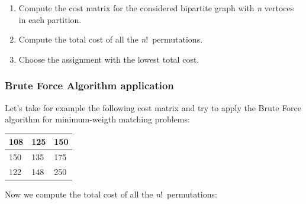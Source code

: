 \begin{enumerate}
    \item {Compute the cost matrix for the considered bipartite graph with \textit{n} vertoces in each partition.}
    \item {Compute the total cost of all the \textit{n}!\ permutations.}
    \item {Choose the assignment with the lowest total cost.}
\end{enumerate}


\subsubsection{Brute Force Algorithm application}

Let's take for example the following cost matrix and try to apply the Brute Force algorithm for minimum-weigth matching problems:

\begin{table}[H]
    \centering
    \begin{tabular}{|m{0.5cm}|m{0.5cm}|m{0.5cm}|}
      \hline
      108 & 125 & 150 \\
      \hline
      150 & 135 & 175 \\
      \hline
      122 & 148 & 250 \\
      \hline
    \end{tabular}
    \end{table}

Now we compute the total cost of all the \textit{n}!\ permutations: 

